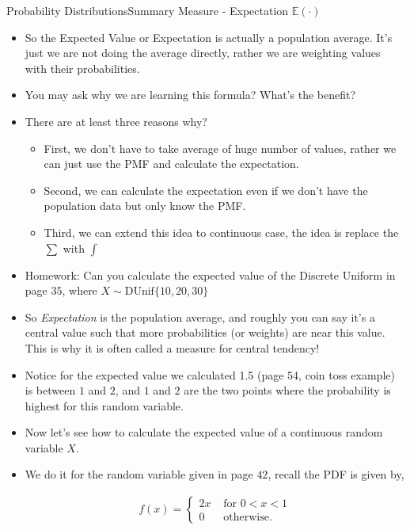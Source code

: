 \documentclass[8pt, usepdftitle=false]{beamer}
\begin{document}
\begin{frame}[allowframebreaks]{Probability Distributions}{Summary Measure - Expectation $\mathbb{E}(\cdot)$}
\begin{itemize}
\item So the Expected Value or Expectation is actually a population average. It's just we are not doing the average directly, rather we are weighting values with their probabilities. 

\item You may ask why we are learning this formula? What's the benefit?

\item There are at least three reasons why?
\medskip
\begin{itemize}
	\item  First, we don't have to take average of huge number of values, rather we can just use the PMF and calculate the expectation. 

	\item Second, we can calculate the expectation even if we don't have the population data but only know the PMF.

	\item Third, we can extend this idea to continuous case, the idea is replace the $\sum$ with $\int$
\end{itemize}

\item Homework: Can you calculate the expected value of the Discrete Uniform in page $35$, where $X \sim \mathrm{DUnif}\{10, 20, 30 \}$


\item So \emph{Expectation} is the population average, and roughly you can say it's a \alert{central value} such that more probabilities (or weights) are near this value. This is why it is often called a measure for \alert{central tendency}! 

\item Notice for the expected value we calculated 1.5 (page 54, coin toss example) is between $1$ and $2$, and $1$ and $2$ are the two points where the probability is highest for this random variable.


\framebreak

\item Now let's see how to calculate the expected value of a continuous random variable $X$.

\item We do it for the random variable given in page $42$, recall the PDF is given by,

\begin{align*}
f(x)= \begin{cases}2 x & \text { for } 0<x<1 \\ 0 & \text { otherwise. }\end{cases}
\end{align*}


\end{itemize}
\end{frame}
\end{document}

